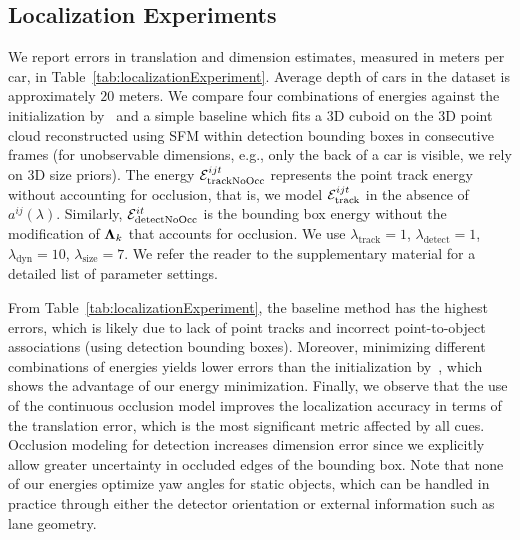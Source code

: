 \subsection{Localization Experiments}
We report errors in translation and dimension estimates, measured in meters per car, in Table~\ref{tab:localizationExperiment}. Average depth of cars in the dataset is approximately $20$ meters. We compare four combinations of energies against the initialization by~\cite{Song_Chandraker_2014} and a simple baseline which fits a 3D cuboid on the 3D point cloud reconstructed using SFM within detection bounding boxes in consecutive frames (for unobservable dimensions, e.g., only the back of a car is visible, we rely on 3D size priors). The energy $\mathcal{E}^{ijt}_{\text{trackNoOcc}}$ represents the point track energy without accounting for occlusion, that is, we model $\mathcal{E}^{ijt}_{\text{track}}$ in the absence of $a^{ij} (\lambda)$. Similarly, $\mathcal{E}^{it}_{\text{detectNoOcc}}$ is the bounding box energy without the modification of $\bm{\Lambda}_k$ that accounts for occlusion. We use $\lambda_{\text{track}} = 1$, $\lambda_{\text{detect}} = 1$, $\lambda_{\text{dyn}} = 10$, $\lambda_{\text{size}} = 7$. We refer the reader to the supplementary material for a detailed list of parameter settings.

From Table~\ref{tab:localizationExperiment}, the baseline method has the highest errors, which is likely due to lack of point tracks and incorrect point-to-object associations (using detection bounding boxes). Moreover, minimizing different combinations of energies yields lower errors than the initialization by~\cite{Song_Chandraker_2014}, which shows the advantage of our energy minimization. Finally, we observe that the use of the continuous occlusion model improves the localization accuracy in terms of the translation error, which is the most significant metric affected by all cues. Occlusion modeling for detection increases dimension error since we explicitly allow greater uncertainty in occluded edges of the bounding box. Note that none of our energies optimize yaw angles for static objects, which can be handled in practice through either the detector orientation or external information such as lane geometry.


